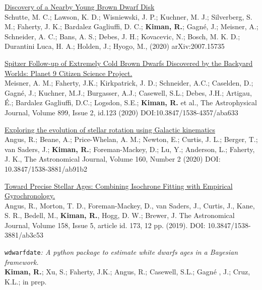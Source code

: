 \documentclass[10pt]{cv}
\begin{document}
\begin{llist}
\href{https://ui.adsabs.harvard.edu/abs/2020AJ....160..156S/abstract}{Discovery of a Nearby Young Brown Dwarf Disk}\\
Schutte, M. C.; Lawson, K. D.; Wisniewski, J. P.; Kuchner, M. J.; Silverberg, S. M.; Faherty, J. K.; Bardalez Gagliuffi, D. C.; \textbf{Kiman, R.}; Gagné, J.; Meisner, A.; Schneider, A. C.; Bans, A. S.; Debes, J. H.; Kovacevic, N.; Bosch, M. K. D.; Durantini Luca, H. A.; Holden, J.; Hyogo, M., (2020) arXiv:2007.15735

\href{https://ui.adsabs.harvard.edu/abs/2020ApJ...899..123M/abstract}{Spitzer Follow-up of Extremely Cold Brown Dwarfs Discovered by the Backyard Worlds: Planet 9 Citizen Science Project.}\\
Meisner, A. M.; Faherty, J.K.; Kirkpatrick, J. D.; Schneider, A.C.; Caselden, D.; Gagné, J.; Kuchner, M.J.; Burgasser, A.J.; Casewell, S.L.; Debes, J.H.; Artigau, É.; Bardalez Gagliuffi, D.C.; Logsdon, S.E.; \textbf{Kiman, R.} et al., The Astrophysical Journal, Volume 899, Issue 2, id.123 (2020) DOI:10.3847/1538-4357/aba633

\href{https://ui.adsabs.harvard.edu/abs/2020AJ....160...90A/abstract}{Exploring the evolution of stellar rotation using Galactic kinematics}\\
Angus, R.; Beane, A.; Price-Whelan, A. M.; Newton, E.; Curtis, J. L.; Berger, T.; van Saders, J.; \textbf{Kiman, R.}; Foreman-Mackey, D.; Lu, Y.; Anderson, L.; Faherty, J. K., The Astronomical Journal, Volume 160, Number 2 (2020) DOI: 10.3847/1538-3881/ab91b2

\href{https://ui.adsabs.harvard.edu/abs/2019AJ....158..173A/abstract}{Toward Precise Stellar Ages: Combining Isochrone Fitting with Empirical Gyrochronology.}\\ 
Angus, R., Morton, T. D., Foreman-Mackey, D., van Saders, J., Curtis, J., Kane, S. R., Bedell, M., \textbf{Kiman, R.}, Hogg, D. W.; Brewer, J. The Astronomical Journal, Volume 158, Issue 5, article id. 173, 12 pp. (2019). DOI: 10.3847/1538-3881/ab3c53



\texttt{wdwarfdate}\textit{: A python package to estimate white dwarfs ages in a Bayesian framework.}\\
\textbf{Kiman, R.}; Xu, S.; Faherty, J.K.; Angus, R.; Casewell, S.L.; Gagn\'e , J.; Cruz, K.L.; in prep. 

\end{llist}
\end{document}
